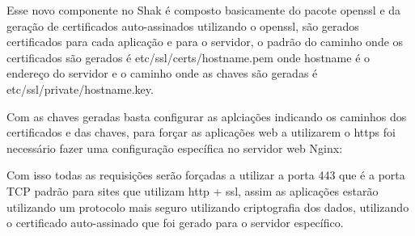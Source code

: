 Esse novo componente no Shak é composto basicamente do pacote openssl e da geração
de certificados auto-assinados utilizando o openssl, são gerados certificados
para cada aplicação e para o servidor, o padrão do caminho onde os certificados são
gerados é etc/ssl/certs/hostname.pem onde hostname é o endereço do servidor
e o caminho onde as chaves são geradas é etc/ssl/private/hostname.key.

Com as chaves geradas basta configurar as aplciações indicando os caminhos dos certificados
e das chaves, para forçar as aplicações web a utilizarem o https foi necessário fazer
uma configuração específica no servidor web Nginx:


Com isso todas as requisições serão forçadas a utilizar a porta 443 que é a porta
TCP padrão para sites que utilizam http + ssl, assim as aplicações estarão utilizando
um protocolo mais seguro utilizando criptografia dos dados, utilizando o
certificado auto-assinado que foi gerado para o servidor específico.


